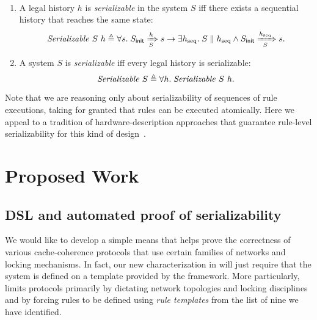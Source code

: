 \begin{definition}[Serializability]\mbox{}\\
  \begin{enumerate}
  \item A legal history $h$ is \emph{serializable} in the system $S$ iff there
    exists a sequential history that reaches the same state:
    \begin{displaymath}
      \mathit{Serializable}\ S\ h \triangleq \forall s.\; S_{\textsf{init}} \xRightarrow[S]{h} s \to \exists h_{\textrm{seq}}.\; S \parallel h_{\textrm{seq}} \wedge S_{\textsf{init}} \xRightarrow[S]{h_{\textrm{seq}}} s.
    \end{displaymath}
  \item A system $S$ is \emph{serializable} iff every legal history is serializable:
    \begin{displaymath}
      \mathit{Serializable}\ S \triangleq \forall h.\; \mathit{Serializable}\ S\ h.
    \end{displaymath}
  \end{enumerate}
  \label{def-sz}
\end{definition}

Note that we are reasoning only about serializability of sequences of rule executions, taking for granted that rules can be executed atomically.
Here we appeal to a tradition of hardware-description approaches that guarantee rule-level serializability for this kind of design~\cite{fesi,kami,Murali:2015,Dave:2005,Dave:2007}.

\section{Proposed Work}

\subsection{\hemiola{} DSL and automated proof of serializability}
\label{sec-hemiola-dsl}

We would like to develop a simple means that helps prove the correctness of various cache-coherence protocols that use certain families of networks and locking mechanisms.
In fact, our new characterization in \hemiola{} will just require that the system is defined on a template provided by the framework.
More particularly, \hemiola{} limits protocols primarily by dictating network topologies and locking disciplines and by forcing rules to be defined using \emph{rule templates} from the list of nine we have identified.

